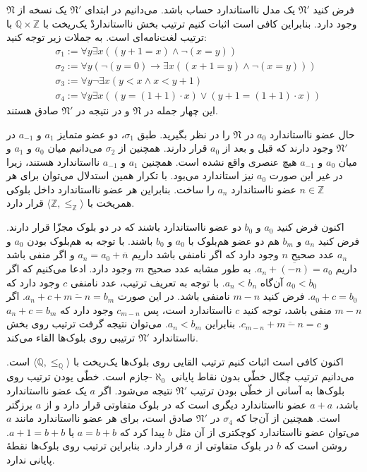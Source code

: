 \begin{ans}
  فرض کنید $\mathfrak{N}'$ یک مدل نااستاندارد حساب باشد. می‌دانیم در ابتدای $\mathfrak{N}'$ یک نسخه از $\mathfrak{N}$ وجود دارد. بنابراین کافی است اثبات کنیم ترتیب بخش نااستانداردْ یک‌ریخت با $\mathbb{Q} \times \mathbb{Z}$ با ترتیب لغت‌نامه‌ای است. به جملات زیر توجه کنید:
  \begin{align*}
    & \sigma_1 := \forall y \exists x ((y + 1 = x) \wedge \neg (x = y)) \\
    & \sigma_2 := \forall y (\neg (y = 0) \to \exists x ((x + 1 = y) \wedge \neg (x = y))) \\
    & \sigma_3 := \forall y \neg \exists x (y < x \wedge x < y + 1) \\
    & \sigma_4 := \forall y \exists x ((y = (1 + 1) \cdot x) \vee (y + 1 = (1 + 1) \cdot x))
  \end{align*}
  این چهار جمله در $\mathfrak{N}$ و در نتیجه در $\mathfrak{N}'$ صادق هستند.

  حال عضو نااستاندارد $a_0$ در $\mathfrak{N}$ را در نظر بگیرید. طبق $\sigma_1$، دو عضو متمایز $a_1$ و $a_{-1}$ در $\mathfrak{N}'$ وجود دارند که قبل و بعد از $a_0$ قرار دارند. همچنین از $\sigma_2$ می‌دانیم میان $a_0$ و $a_1$ و میان $a_0$ و $a_{-1}$ هیچ عنصری واقع نشده است. همچنین $a_1$ و $a_{-1}$ نااستاندارد هستند، زیرا در غیر این صورت $a_0$ نیز استاندارد می‌بود. با تکرار همین استدلال می‌توان برای هر $n \in \mathbb{Z}$ عضو نااستاندارد $a_n$ را ساخت. بنابراین هر عضو نااستاندارد داخل بلوکی همریخت با $\langle \mathbb{Z}, \le_\mathbb{Z} \rangle$ قرار دارد.

  اکنون فرض کنید $a_0$ و $b_0$ دو عضو نااستاندارد باشند که در دو بلوک مجزّا قرار دارند. فرض کنید $a_n$ و $b_m$ هم دو عضو هم‌بلوک با $a_0$ و $b_0$ باشند. با توجه به هم‌بلوک بودن $a_0$ و $a_n$ عدد صحیح $n$ وجود دارد که اگر نامنفی باشد داریم $a_n = a_0 + \overline{n}$ و اگر منفی باشد داریم $a_n + \overline{(-n)} = a_0$. به طور مشابه عدد صحیح $m$ وجود دارد. ادعا می‌کنیم که اگر $a_0 < b_0$ آن‌گاه $a_n < b_n$. با توجه به تعریف ترتیب، عدد نامنفی $c$ وجود دارد که $a_0 + c = b_0$. فرض کنید $m - n$ نامنفی باشد. در این صورت $a_n + c + \overline{m - n} = b_m$. اگر $m - n$ منفی باشد، توجه کنید $c$ نااستاندارد است، پس $c_{m - n}$ وجود دارد که $a_n + c = b_m$ و $c_{m - n} + \overline{m - n} = c$. بنابراین $a_n < b_m$. می‌توان نتیجه گرفت ترتیب روی بخش نااستاندارد $\mathfrak{N}'$ ترتیبی روی بلوک‌ها القاء می‌کند.

  اکنون کافی است اثبات کنیم ترتیب القایی روی بلوک‌ها یک‌ریخت با $\langle \mathbb{Q}, \le_\mathbb{Q} \rangle$ است. می‌دانیم ترتیب چگال خطّی بدون نقاط پایانی $\aleph_0$-جازم است. خطّی یودن ترتیب روی بلوک‌ها به آسانی از خطّی بودن ترتیب $\mathfrak{N}'$ نتیجه می‌شود. اگر $a$ یک عضو نااستاندارد باشد، $a + a$ عضو نااستاندارد دیگری است که در بلوک متفاوتی قرار دارد و از $a$ برزگتر است. همچنین از آن‌جا که $\sigma_4$ در $\mathfrak{N}'$ صادق است، برای هر عضو نااستاندارد مانند $a$ می‌توان عضو نااستاندارد کوچکتری از آن مثل $b$ پیدا کرد که $a = b + b$ یا $a + 1 = b + b$. روشن است که $b$ در بلوک متفاوتی از $a$ قرار دارد. بنابراین ترتیب روی بلوک‌ها نقطهٔ پایانی ندارد.


\end{ans}
